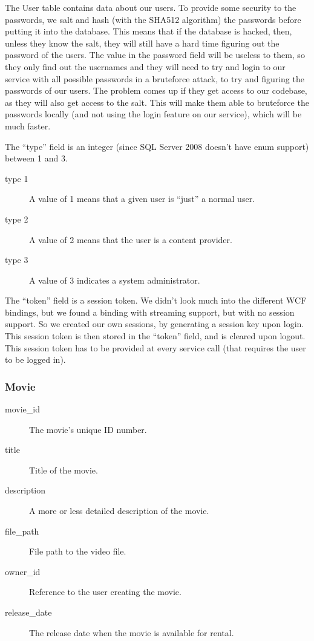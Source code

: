 The User table contains data about our users. To provide some security to the passwords, we salt and hash (with the SHA512 algorithm) the passwords before putting it into the database. This means that if the database is hacked, then, unless they know the salt, they will still have a hard time figuring out the password of the users. The value in the password field will be useless to them, so they only find out the usernames and they will need to try and login to our service with all possible passwords in a bruteforce attack, to try and figuring the passwords of our users.
The problem comes up if they get access to our codebase, as they will also get access to the salt. This will make them able to bruteforce the passwords locally (and not using the login feature on our service), which will be much faster.

The ``type'' field is an integer (since SQL Server 2008 doesn't have enum support) between 1 and 3. 

\begin{description}
\item[type 1] A value of 1 means that a given user is ``just'' a normal user.
\item[type 2] A value of 2 means that the user is a content provider.
\item[type 3] A value of 3 indicates a system administrator.
\end{description}

The ``token'' field is a session token. We didn't look much into the different WCF bindings, but we found a binding with streaming support, but with no session support. So we created our own sessions, by generating a session key upon login. This session token is then stored in the ``token'' field, and is cleared upon logout. This session token has to be provided at every service call (that requires the user to be logged in).

\subsubsection{Movie}
\label{Design_Database_Tables_Movie}

\begin{description}
\item[movie\_id] The movie's unique ID number.
\item[title] Title of the movie.
\item[description] A more or less detailed description of the movie.
\item[file\_path] File path to the video file.
\item[owner\_id] Reference to the user creating the movie.
\item[release\_date] The release date when the movie is available for rental.
\end{description}

